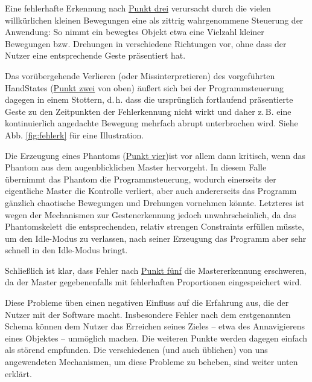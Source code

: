 	Eine fehlerhafte Erkennung nach \hyperref[itm:problem3]{Punkt drei} verursacht durch die vielen willkürlichen kleinen Bewegungen eine als \glqq zittrig\grqq{} wahrgenommene Steuerung der Anwendung: So nimmt ein bewegtes Objekt etwa eine Vielzahl kleiner Bewegungen bzw. Drehungen in verschiedene Richtungen vor, ohne dass der Nutzer eine entsprechende Geste präsentiert hat.\par 
	Das vorübergehende Verlieren (oder Missinterpretieren) des vorgeführten HandStates (\hyperref[itm:problem2]{Punkt zwei} von oben) äußert sich bei der Programmsteuerung dagegen in einem Stottern, d.\,h. dass die ursprünglich fortlaufend präsentierte Geste zu den Zeitpunkten der Fehlerkennung nicht wirkt und daher z.\,B. eine kontinuierlich angedachte Bewegung mehrfach abrupt unterbrochen wird. Siehe Abb. \ref{fig:fehlerk} für eine Illustration.\par 
	Die Erzeugung eines Phantoms (\hyperref[itm:problem4]{Punkt vier})ist vor allem dann kritisch, wenn das Phantom aus dem augenblicklichen Master hervorgeht. In diesem Falle übernimmt das Phantom die Programmsteuerung, wodurch einerseits der eigentliche Master die Kontrolle verliert, aber auch andererseits das Programm gänzlich chaotische Bewegungen und Drehungen vornehmen könnte. Letzteres ist wegen der Mechanismen zur Gestenerkennung jedoch unwahrscheinlich, da das Phantomskelett die entsprechenden, relativ strengen Constraints  erfüllen müsste, um den Idle-Modus zu verlassen, nach seiner Erzeugung das Programm aber  sehr schnell in den Idle-Modus bringt.\par 
	Schließlich ist klar, dass Fehler nach \hyperref[itm:problem5]{Punkt fünf} die Mastererkennung erschweren, da der Master gegebenenfalls mit fehlerhaften Proportionen eingespeichert wird.
\par\bigskip
	Diese Probleme üben einen negativen Einfluss auf die Erfahrung aus, die der Nutzer mit der Software macht. Insbesondere Fehler nach dem erstgenannten Schema können dem Nutzer das Erreichen seines Zieles -- etwa des Annavigierens eines Objektes -- unmöglich machen. Die weiteren Punkte werden dagegen einfach als störend empfunden. Die verschiedenen (und auch üblichen) von uns angewendeten Mechanismen, um diese Probleme zu beheben, sind weiter unten erklärt.\par
